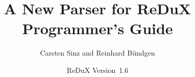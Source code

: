 \documentclass[twoside,titlepage]{article}
\title{A New Parser for ReDuX\\Programmer's Guide}
\author{Carsten Sinz and Reinhard B\"undgen}
\date{ReDuX Version~1.6}
\begin{document}
\maketitle
\pagebreak

\tableofcontents
\listoffigures
\listoftables
\newpage










\appendix



\end{document}

